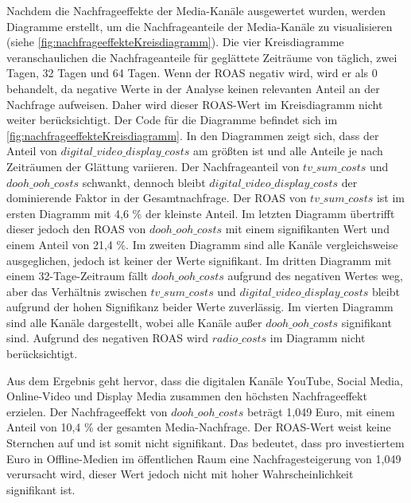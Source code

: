  \par
Nachdem die Nachfrageeffekte der Media-Kanäle ausgewertet wurden, werden Diagramme erstellt, um die Nachfrageanteile der Media-Kanäle zu visualisieren (siehe \autoref{fig:nachfrageeffekteKreisdiagramm}). Die vier Kreisdiagramme veranschaulichen die Nachfrageanteile für geglättete Zeiträume von täglich, zwei Tagen, 32 Tagen und 64 Tagen. Wenn der \ac{ROAS} negativ wird, wird er als \(0\) behandelt, da negative Werte in der Analyse keinen relevanten Anteil an der Nachfrage aufweisen. Daher wird dieser \ac{ROAS}-Wert im Kreisdiagramm nicht weiter berücksichtigt. Der Code für die Diagramme befindet sich im \autoref{fig:nachfrageeffekteKreisdiagramm}. In den Diagrammen zeigt sich, dass der Anteil von \(digital\_video\_display\_costs\) am größten ist und alle Anteile je nach Zeiträumen der Glättung variieren. Der Nachfrageanteil von \(tv\_sum\_costs\) und \(dooh\_ooh\_costs\) schwankt, dennoch bleibt \(digital\_video\_display\_costs\) der dominierende Faktor in der Gesamtnachfrage. Der \ac{ROAS} von \(tv\_sum\_costs\) ist im ersten Diagramm mit 4,6 \% der kleinste Anteil. Im letzten Diagramm übertrifft dieser jedoch den \ac{ROAS} von \(dooh\_ooh\_costs\) mit einem signifikanten Wert und einem Anteil von 21,4 \%. Im zweiten Diagramm sind alle Kanäle vergleichsweise ausgeglichen, jedoch ist keiner der Werte signifikant. Im dritten Diagramm mit einem 32-Tage-Zeitraum fällt \(dooh\_ooh\_costs\) aufgrund des negativen Wertes weg, aber das Verhältnis zwischen \(tv\_sum\_costs\) und \(digital\_video\_display\_costs\) bleibt aufgrund der hohen Signifikanz beider Werte zuverlässig. Im vierten Diagramm sind alle Kanäle dargestellt, wobei alle Kanäle außer \(dooh\_ooh\_costs\) signifikant sind. Aufgrund des negativen \ac{ROAS} wird \(radio\_costs\) im Diagramm nicht berücksichtigt. \par
Aus dem Ergebnis geht hervor, dass die digitalen Kanäle YouTube, Social Media, Online-Video und Display Media zusammen den höchsten Nachfrageeffekt erzielen. Der Nachfrageeffekt von \(dooh\_ooh\_costs\) beträgt 1,049 Euro, mit einem Anteil von 10,4 \% der gesamten Media-Nachfrage. Der \ac{ROAS}-Wert weist keine Sternchen auf und ist somit nicht signifikant. Das bedeutet, dass pro investiertem Euro in Offline-Medien im öffentlichen Raum eine Nachfragesteigerung von 1,049 verursacht wird, dieser Wert jedoch nicht mit hoher Wahrscheinlichkeit signifikant ist.
